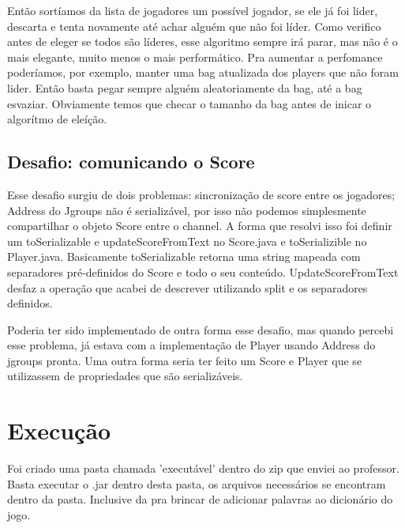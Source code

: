 \documentclass{article}
\begin{document}
Então sortíamos da lista de jogadores um possível jogador, se ele já foi lider, descarta e tenta novamente até achar alguém que não foi líder. 
Como verifico antes de eleger se todos são líderes, esse algoritmo sempre irá parar, mas não é o mais elegante, muito menos o mais performático.
Pra aumentar a perfomance poderíamos, por exemplo, manter uma bag atualizada dos players que não foram lider. Então basta pegar sempre alguém aleatoriamente da bag, até a bag esvaziar. Obviamente temos que checar o tamanho da bag antes de inicar o algorítmo de eleíção.

\subsection{Desafio: comunicando o Score }
Esse desafio surgiu de dois problemas: sincronização de score entre os jogadores; Address do Jgroups não é serializável, por isso não podemos simplesmente compartilhar o objeto Score entre o channel. A forma que resolvi isso foi definir um toSerializable e updateScoreFromText no Score.java e toSerializible no Player.java. 
Basicamente toSerializable retorna uma string mapeada com separadores pré-definidos do Score e todo o seu conteúdo. UpdateScoreFromText desfaz a operação que acabei de descrever utilizando split e os separadores definidos.


Poderia ter sido implementado de outra forma esse desafio, mas quando percebi esse problema, já estava com a implementação de Player usando Address do jgroups pronta. Uma outra forma seria ter feito um Score e Player que se utilizassem de propriedades que são serializáveis.

\section{Execução}
Foi criado uma pasta chamada 'executável' dentro do zip que enviei ao professor. 
Basta executar o .jar dentro desta pasta, os arquivos necessários se encontram dentro da pasta.
Inclusive da pra brincar de adicionar palavras ao dicionário do jogo.
\end{document}
